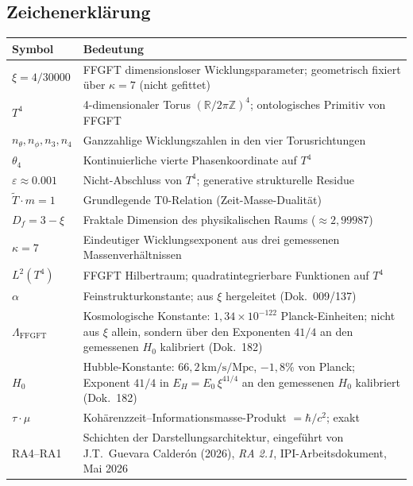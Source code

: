 
\subsection*{Zeichenerklärung}

{\small
\begin{tabular}{p{3.2cm}p{10.5cm}}
\toprule
\textbf{Symbol} & \textbf{Bedeutung} \\
\midrule
$\xi = 4/30000$ & FFGFT dimensionsloser Wicklungsparameter; geometrisch fixiert über $\kappa=7$ (nicht gefittet) \\
$T^4$ & 4-dimensionaler Torus $(\mathbb{R}/2\pi\mathbb{Z})^4$; ontologisches Primitiv von FFGFT \\
$n_\theta, n_\phi, n_3, n_4$ & Ganzzahlige Wicklungszahlen in den vier Torusrichtungen \\
$\theta_4$ & Kontinuierliche vierte Phasenkoordinate auf $T^4$ \\
$\varepsilon \approx 0.001$ & Nicht-Abschluss von $T^4$; generative strukturelle Residue \\
$\tilde{T}\cdot m = 1$ & Grundlegende T0-Relation (Zeit-Masse-Dualität) \\
$D_f = 3 - \xi$ & Fraktale Dimension des physikalischen Raums ($\approx 2{,}99987$) \\
$\kappa = 7$ & Eindeutiger Wicklungsexponent aus drei gemessenen Massenverhältnissen \\
$L^2(T^4)$ & FFGFT Hilbertraum; quadratintegrierbare Funktionen auf $T^4$ \\
$\alpha$ & Feinstrukturkonstante; aus $\xi$ hergeleitet (Dok.~009/137) \\
$\Lambda_\text{FFGFT}$ & Kosmologische Konstante: $1{,}34\times10^{-122}$ Planck-Einheiten; nicht aus $\xi$ allein, sondern über den Exponenten $41/4$ an den gemessenen $H_0$ kalibriert (Dok.~182) \\
$H_0$ & Hubble-Konstante: $66{,}2\,\text{km/s/Mpc}$, $-1{,}8\%$ von Planck; Exponent $41/4$ in $E_H = E_0\,\xi^{41/4}$ an den gemessenen $H_0$ kalibriert (Dok.~182) \\
$\tau\cdot\mu$ & Kohärenzzeit--Informationsmasse-Produkt $= \hbar/c^2$; exakt \\
RA4--RA1 & Schichten der Darstellungsarchitektur, eingeführt von J.T.~Guevara Calderón (2026), \textit{RA 2.1}, IPI-Arbeitsdokument, Mai 2026 \\
\bottomrule
\end{tabular}
}

